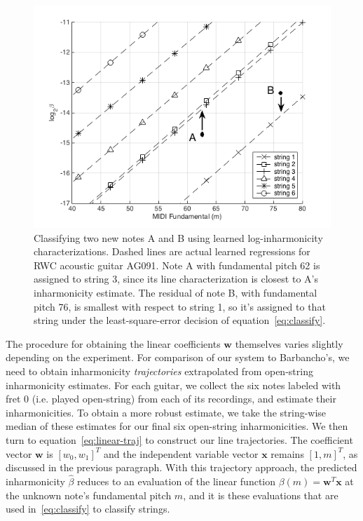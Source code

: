 \documentclass[12pt]{cmuthesis}
\begin{document}
\begin{figure}[!htbp] 
\label{fig:classify}
\centering
\includegraphics[scale=0.75]{classify}
\caption{Classifying two new notes A and B using learned log-inharmonicity characterizations. Dashed lines are actual learned regressions for RWC acoustic guitar AG091. Note A with fundamental pitch 62 is assigned to string 3, since its line characterization is closest to A's inharmonicity estimate. The residual of note B, with fundamental pitch 76, is smallest with respect to string 1, so it's assigned to that string under the least-square-error decision of equation~\eqref{eq:classify}.}
\end{figure}

The procedure for obtaining the linear coefficients $\mathbf{w}$ themselves varies slightly depending on the experiment. For comparison of our system to Barbancho's, we need to obtain inharmonicity \textit{trajectories} extrapolated from open-string inharmonicity estimates. For each guitar, we collect the six notes labeled with fret 0 (i.e. played open-string) from each of its recordings, and estimate their inharmonicities. To obtain a more robust estimate, we take the string-wise median of these estimates for our final six open-string inharmonicities. We then turn to equation~\eqref{eq:linear-traj} to construct our line trajectories. The coefficient vector $\mathbf{w}$ is $[w_0, w_1]^T$ and the independent variable vector $\mathbf{x}$ remains $[1, m]^T$, as discussed in the previous paragraph. With this trajectory approach, the predicted inharmonicity $\hat{\beta}$ reduces to an evaluation of the linear function $\beta(m) = \mathbf{w}^T\mathbf{x}$ at the unknown note's fundamental pitch $m$, and it is these evaluations that are used in~\eqref{eq:classify} to classify strings.
\end{document}
